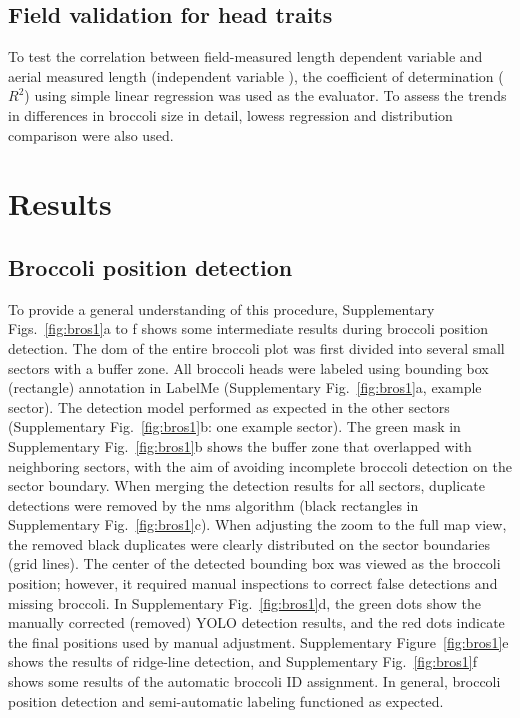 \subsection{Field validation for head traits}

To test the correlation between field-measured length \replaced{[}{(}dependent variable  \replaced{]}{)} and aerial  measured length (independent variable ), the coefficient of determination ($R^2$) using simple linear regression was used as the evaluator. To assess the trends in differences in broccoli size in detail, \gls{lowess} regression and distribution comparison were also used.

\section{Results}

\subsection{Broccoli position detection}

To provide a general understanding of this procedure, Supplementary Figs.~\ref{fig:bros1}a to f shows some intermediate results during broccoli position detection. The \gls{dom} of the entire broccoli plot was first divided into several small sectors with a buffer zone. All broccoli heads were labeled using bounding box (rectangle) annotation in LabelMe (Supplementary Fig.~\ref{fig:bros1}a, example sector). The detection model performed as expected in the other sectors (Supplementary Fig.~\ref{fig:bros1}b: one example sector). The green mask in Supplementary Fig.~\ref{fig:bros1}b shows the buffer zone that overlapped with neighboring sectors, with the aim of avoiding incomplete broccoli detection on the sector boundary. When merging the detection results for all sectors, duplicate detections were removed by the \gls{nms} algorithm (black rectangles in Supplementary Fig.~\ref{fig:bros1}c). When adjusting the zoom to the full map view, the removed black duplicates were clearly distributed on the sector boundaries (grid lines). The center of the detected bounding box was viewed as the broccoli position; however, it required manual inspections to correct false detections and missing broccoli. In Supplementary Fig.~\ref{fig:bros1}d, the green dots show the manually corrected (removed) YOLO detection results, and the red dots indicate the final positions used by manual adjustment. Supplementary Figure~\ref{fig:bros1}e shows the results of ridge-line detection, and Supplementary Fig.~\ref{fig:bros1}f shows some results of the automatic broccoli ID assignment. In general, broccoli position detection and semi-automatic labeling functioned as expected.


